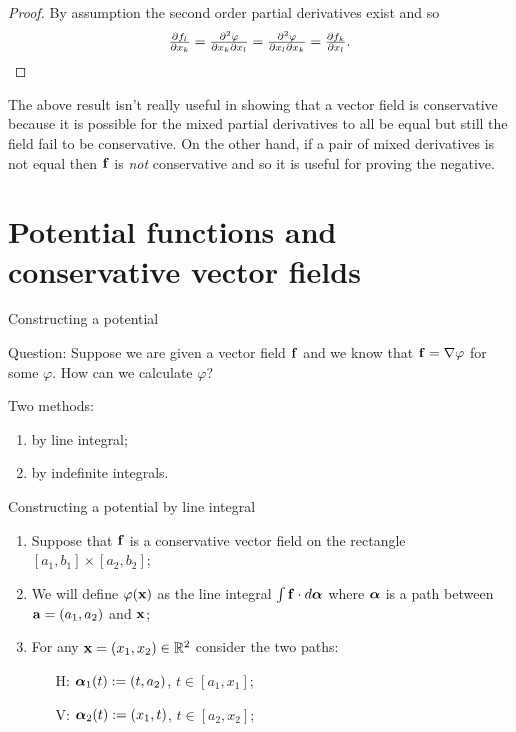\begin{proof}
    By assumption the second order partial derivatives exist and so
    \[
        \tfrac{\partial f_l}{\partial x_k}
        = \tfrac{\partial^2 \varphi}{\partial x_k \partial x_l}
        = \tfrac{\partial^2 \varphi}{\partial x_l \partial x_k}
        = \tfrac{\partial f_k}{\partial x_l}. \qedhere
    \]
\end{proof}

The above result isn't really useful in showing that a vector field is conservative because it is possible for the mixed partial derivatives to all be equal but still the field fail to be conservative.
On the other hand, if a pair of mixed derivatives is not equal then \(\ff\) is \emph{not} conservative and so it is useful for proving the negative.


\section{Potential functions and conservative vector fields}


 {Constructing a potential}

 {Question:}
Suppose we are given a vector field \(\ff\) and we know that \(\ff = \nabla \varphi\) for some \(\varphi\).
How can we calculate \(\varphi\)?

{Two methods:}
\begin{enumerate}
    \item by line integral;
    \item by indefinite integrals.
\end{enumerate}










{Constructing a potential by line integral}






\begin{enumerate}
    \item Suppose that \(\ff\) is a conservative vector field on the rectangle \([a_1,b_1]\times [a_2,b_2]\);
    \item We will define \(\varphi(\xx)\) as the line integral \(\int \ff \cdot d\aalpha\) where \(\aalpha\) is a path between \(\aa=(a_1,a_2)\) and \(\xx\);
    \item For any \(\xx = (x_1,x_2) \in \bR^2\) consider the two paths:
          \begin{itemize}
              \item[H:] \(\aalpha_1(t) := (t,a_2)\), \(t\in [a_1,x_1]\);
              \item[V:]  \(\aalpha_2(t) := (x_1,t)\),  \(t\in [a_2,x_2]\);
          \end{itemize}
\end{enumerate}


